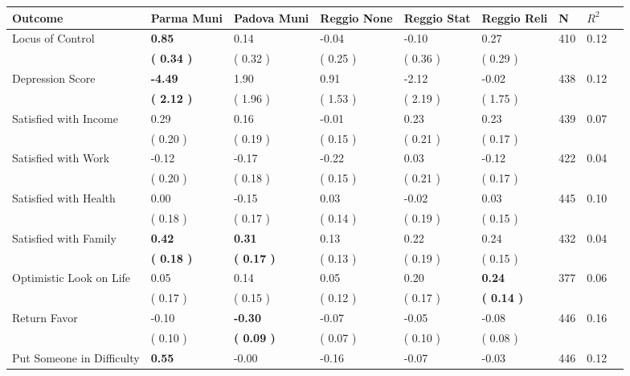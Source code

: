 \begin{tabular}{L{6.2cm} C{1.8cm} C{1.8cm} C{1.8cm} C{1.8cm} C{1.8cm} C{1.8cm} C{0.3cm} C{0.3cm}}
\toprule
 \textbf{Outcome} & \textbf{Parma Muni} & \textbf{Padova Muni} & \textbf{Reggio None} & \textbf{Reggio Stat} & \textbf{Reggio Reli} & \textbf{N} & \textbf{$ R^2$} \\
\midrule
Locus of Control & \textbf{     0.85} &      0.14 &     -0.04 &     -0.10 &      0.27  & 410 &       0.12 \\ 
 & \textbf{(     0.34 )} & (     0.32 ) & (     0.25 ) & (     0.36 ) & (     0.29 )  & \\
Depression Score & \textbf{    -4.49} &      1.90 &      0.91 &     -2.12 &     -0.02  & 438 &       0.12 \\ 
 & \textbf{(     2.12 )} & (     1.96 ) & (     1.53 ) & (     2.19 ) & (     1.75 )  & \\
Satisfied with Income &      0.29 &      0.16 &     -0.01 &      0.23 &      0.23  & 439 &       0.07 \\ 
 & (     0.20 ) & (     0.19 ) & (     0.15 ) & (     0.21 ) & (     0.17 )  & \\
Satisfied with Work &     -0.12 &     -0.17 &     -0.22 &      0.03 &     -0.12  & 422 &       0.04 \\ 
 & (     0.20 ) & (     0.18 ) & (     0.15 ) & (     0.21 ) & (     0.17 )  & \\
Satisfied with Health &      0.00 &     -0.15 &      0.03 &     -0.02 &      0.03  & 445 &       0.10 \\ 
 & (     0.18 ) & (     0.17 ) & (     0.14 ) & (     0.19 ) & (     0.15 )  & \\
Satisfied with Family & \textbf{     0.42} & \textbf{     0.31} &      0.13 &      0.22 &      0.24  & 432 &       0.04 \\ 
 & \textbf{(     0.18 )} & \textbf{(     0.17 )} & (     0.13 ) & (     0.19 ) & (     0.15 )  & \\
Optimistic Look on Life &      0.05 &      0.14 &      0.05 &      0.20 & \textbf{     0.24}  & 377 &       0.06 \\ 
 & (     0.17 ) & (     0.15 ) & (     0.12 ) & (     0.17 ) & \textbf{(     0.14 )}  & \\
Return Favor &     -0.10 & \textbf{    -0.30} &     -0.07 &     -0.05 &     -0.08  & 446 &       0.16 \\ 
 & (     0.10 ) & \textbf{(     0.09 )} & (     0.07 ) & (     0.10 ) & (     0.08 )  & \\
Put Someone in Difficulty & \textbf{     0.55} &     -0.00 &     -0.16 &     -0.07 &     -0.03  & 446 &       0.12 \\ 

\end{tabular}
